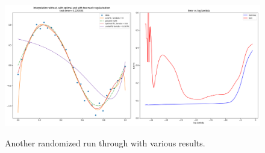\documentclass{article}
\begin{document}
\begin{figure}[h]
	\centering
	\includegraphics[width=\linewidth,height=6.1cm]{plots/full5.png}
	\caption{Another randomized run through with various results.}
	\label{plot:full5}
\end{figure}
	
\end{document}
